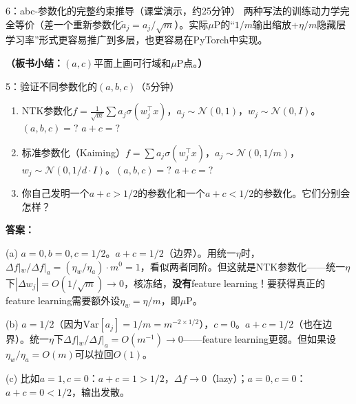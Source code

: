 \documentclass[11pt,a4paper]{article}
\newcommand{\cN}{\mathcal{N}}
\begin{document}
\begin{handcalc}{6：abc-参数化的完整约束推导（课堂演示，约25分钟）}
两种写法的训练动力学完全等价（差一个重新参数化$\tilde a_j = a_j/\sqrt{m}$）。实际$\mu$P的``$1/m$输出缩放+$\eta/m$隐藏层学习率''形式更容易推广到多层，也更容易在PyTorch中实现。

\medskip
\textbf{（板书小结：}$(a,c)$平面上画可行域和$\mu$P点。\textbf{）}

\begin{center}
\end{center}
\end{handcalc}

\begin{classexercise}{5：验证不同参数化的$(a,b,c)$（5分钟）}
\begin{enumerate}[label=(\alph*)]
\item NTK参数化$f=\frac{1}{\sqrt{m}}\sum a_j\sigma(w_j^\top x)$，$a_j\sim\cN(0,1)$，$w_j\sim\cN(0,I)$。$(a,b,c)=?$ $a+c=?$
\item 标准参数化（Kaiming）$f=\sum a_j\sigma(w_j^\top x)$，$a_j\sim\cN(0,1/m)$，$w_j\sim\cN(0,1/d\cdot I)$。$(a,b,c)=?$ $a+c=?$
\item 你自己发明一个$a+c>1/2$的参数化和一个$a+c<1/2$的参数化。它们分别会怎样？
\end{enumerate}

\textbf{答案：}

(a) $a=0,b=0,c=1/2$。$a+c=1/2$（边界）。用统一$\eta$时，$\Delta f|_w/\Delta f|_a=(\eta_w/\eta_a)\cdot m^0 = 1$，看似两者同阶。但这就是NTK参数化——统一$\eta$下$|\Delta w_j|=O(1/\sqrt{m})\to 0$，核冻结，\textbf{没有}feature learning！要获得真正的feature learning需要额外设$\eta_w=\eta/m$，即$\mu$P。

(b) $a=1/2$（因为$\text{Var}[a_j]=1/m=m^{-2\times 1/2}$），$c=0$。$a+c=1/2$（也在边界）。统一$\eta$下$\Delta f|_w/\Delta f|_a=O(m^{-1})\to 0$——feature learning更弱。但如果设$\eta_w/\eta_a=O(m)$可以拉回$O(1)$。

(c) 比如$a=1,c=0$：$a+c=1>1/2$，$\Delta f\to 0$（lazy）；$a=0,c=0$：$a+c=0<1/2$，输出发散。
\end{classexercise}
\end{document}
